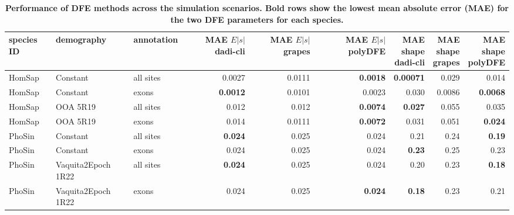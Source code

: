 \documentclass[hidelinks]{article}
\begin{document}
\begin{table}[ht]
\centering
\small
\caption{\bf{Performance of DFE methods across the simulation scenarios}. 
Bold rows show the lowest mean absolute error (MAE) for the two DFE parameters
for each species.}
\begin{tabular}{lllrrrrrr}
\toprule
species ID & demography & annotation & \makecell{MAE \\ $E|s|$ \\ dadi-cli} & \makecell{MAE \\ $E|s|$ \\ grapes} & \makecell{MAE \\ $E|s|$ \\ polyDFE} & \makecell{MAE \\ shape \\ dadi-cli} & \makecell{MAE \\ shape \\ grapes} & \makecell{MAE \\ shape \\ polyDFE} \\
\midrule
HomSap & Constant & all sites & 0.0027 & 0.0111 & \bf{0.0018} & \bf{0.00071} & 0.029 & 0.014 \\
HomSap & Constant & exons & \bf{0.0012} & 0.0101 & 0.0023 & 0.030 & 0.0086 & \bf{0.0068} \\
HomSap & OOA 5R19 & all sites & 0.012 & 0.012 & \bf{0.0074} & \bf{0.027} & 0.055 & 0.035 \\
HomSap & OOA 5R19 & exons & 0.014 & 0.0111 & \bf{0.0072} & 0.031 & 0.051 & \bf{0.024} \\
PhoSin & Constant & all sites & \bf{0.024} & 0.025 & 0.024 & 0.21 & 0.24 & \bf{0.19} \\
PhoSin & Constant & exons & 0.024 & 0.025 & 0.024 & \bf{0.23} & 0.25 & 0.23 \\
PhoSin & Vaquita2Epoch 1R22 & all sites & \bf{0.024} & 0.025 & 0.024 & 0.20 & 0.23 & \bf{0.18} \\
PhoSin & Vaquita2Epoch 1R22 & exons & 0.024 & 0.025 & \bf{0.024} & \bf{0.18} & 0.23 & 0.21 \\
\bottomrule
\end{tabular}
\label{tab:dfe_table}
\end{table}
\end{document}
